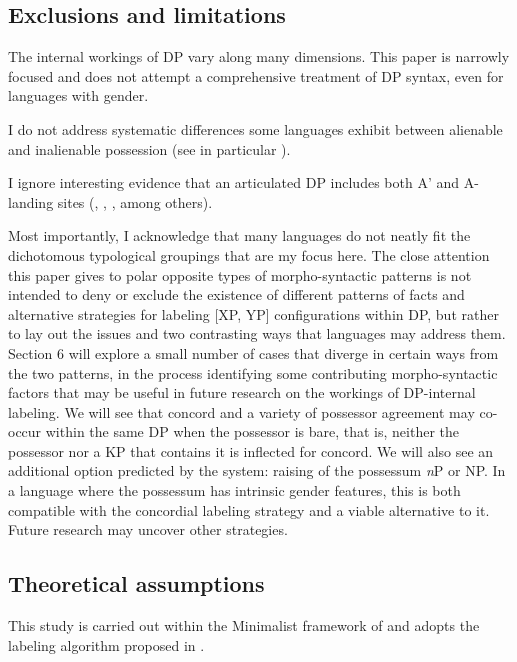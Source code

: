 \documentclass[output=paper
,modfonts
,nonflat]{langsci/langscibook}
\begin{document}
\subsection{Exclusions and limitations}
The internal workings of DP vary along many dimensions. This paper is narrowly focused and does not attempt a comprehensive treatment of DP syntax, even for languages with gender.

I do not address systematic differences some languages exhibit between alienable and inalienable possession (see in particular \citealt{Den_Dikken2015}).     

I ignore interesting evidence that an articulated DP includes both A' and A-landing sites (\citealt{1983}, \citealt{Gavruseva2000}, \citealt{Alexiadou2001}, \citealt{Haegeman2004} among others).    

Most importantly, I acknowledge that many languages do not neatly fit the dichotomous typological groupings that are my focus here. The close attention this paper gives to polar opposite types of morpho-syntactic patterns is not intended to deny or exclude the existence of different patterns of facts and alternative strategies for labeling [XP, YP] configurations within DP, but rather to lay out the issues and two contrasting ways that languages may address them. Section 6 will explore a small number of cases that diverge in certain ways from the two patterns, in the process identifying some contributing morpho-syntactic factors that may be useful in future research on the workings of DP-internal labeling. We will see that concord and a variety of possessor agreement may co-occur within the same DP when the possessor is bare, that is, neither the possessor nor a KP that contains it is inflected for concord. We will also see an additional option predicted by the system: raising of the possessum \textit{n}P or NP. In a language where the possessum has intrinsic gender features, this is both compatible with the concordial labeling strategy and a viable alternative to it. Future research may uncover other strategies.    

\subsection{Theoretical assumptions}
This study is carried out within the Minimalist framework of \citet{Chomsky2000, Chomsky2001} and adopts the labeling algorithm proposed in \citet{Chomsky2013, Chomsky2015}. 
\end{document}
